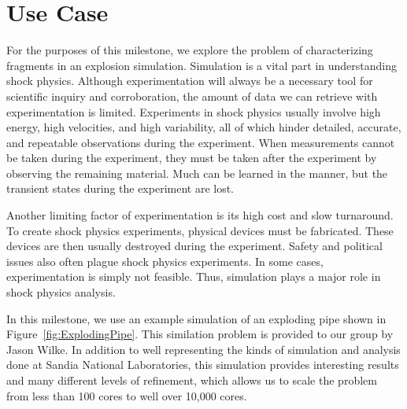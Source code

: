 \section{Use Case}
\label{sec:UseCase}

For the purposes of this milestone, we explore the problem of
characterizing fragments in an explosion simulation.  Simulation is a vital
part in understanding shock physics.  Although experimentation will always
be a necessary tool for scientific inquiry and corroboration, the amount of
data we can retrieve with experimentation is limited.  Experiments in shock
physics usually involve high energy, high velocities, and high variability,
all of which hinder detailed, accurate, and repeatable observations during
the experiment.  When measurements cannot be taken during the experiment,
they must be taken after the experiment by observing the remaining
material.  Much can be learned in the manner, but the transient states
during the experiment are lost.

Another limiting factor of experimentation is its high cost and slow
turnaround.  To create shock physics experiments, physical devices must be
fabricated.  These devices are then usually destroyed during the
experiment.  Safety and political issues also often plague shock physics
experiments.  In some cases, experimentation is simply not feasible.  Thus,
simulation plays a major role in shock physics analysis.

In this milestone, we use an example simulation of an exploding pipe shown
in Figure~\ref{fig:ExplodingPipe}.  This similation problem is provided to
our group by Jason Wilke.  In addition to well representing the kinds of
simulation and analysis done at Sandia National Laboratories, this
simulation provides interesting results and many different levels of
refinement, which allows us to scale the problem from less than 100 cores
to well over 10,000 cores.

